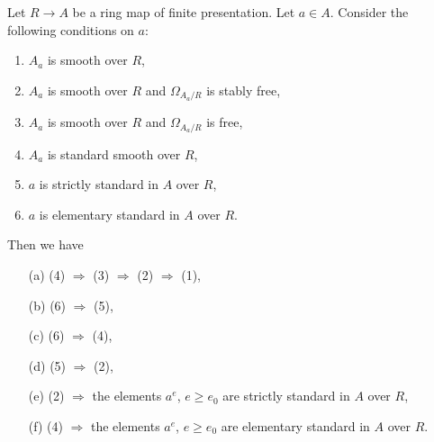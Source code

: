 \begin{lemma}
\label{lemma-compare-standard}
Let $R \to A$ be a ring map of finite presentation.
Let $a \in A$. Consider the following conditions on $a$:
\begin{enumerate}
\item $A_a$ is smooth over $R$,
\item $A_a$ is smooth over $R$ and $\Omega_{A_a/R}$ is stably free,
\item $A_a$ is smooth over $R$ and $\Omega_{A_a/R}$ is free,
\item $A_a$ is standard smooth over $R$,
\item $a$ is strictly standard in $A$ over $R$,
\item $a$ is elementary standard in $A$ over $R$.
\end{enumerate}
Then we have
\begin{enumerate}
\item[(a)] (4) $\Rightarrow$ (3) $\Rightarrow$ (2) $\Rightarrow$ (1),
\item[(b)] (6) $\Rightarrow$ (5),
\item[(c)] (6) $\Rightarrow$ (4),
\item[(d)] (5) $\Rightarrow$ (2),
\item[(e)] (2) $\Rightarrow$ the elements $a^e$, $e \geq e_0$ are
strictly standard in $A$ over $R$,
\item[(f)] (4) $\Rightarrow$ the elements $a^e$, $e \geq e_0$ are
elementary standard in $A$ over $R$.
\end{enumerate}
\end{lemma}

